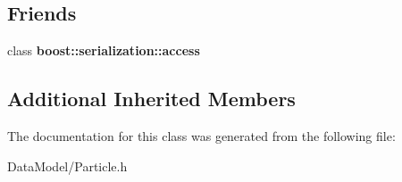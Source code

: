 \subsection*{Friends}
\begin{DoxyCompactItemize}
\item 
\hypertarget{classMCParticle_ac98d07dd8f7b70e16ccb9a01abf56b9c}{class {\bfseries boost\-::serialization\-::access}}\label{classMCParticle_ac98d07dd8f7b70e16ccb9a01abf56b9c}

\end{DoxyCompactItemize}
\subsection*{Additional Inherited Members}


The documentation for this class was generated from the following file\-:\begin{DoxyCompactItemize}
\item 
Data\-Model/Particle.\-h\end{DoxyCompactItemize}
